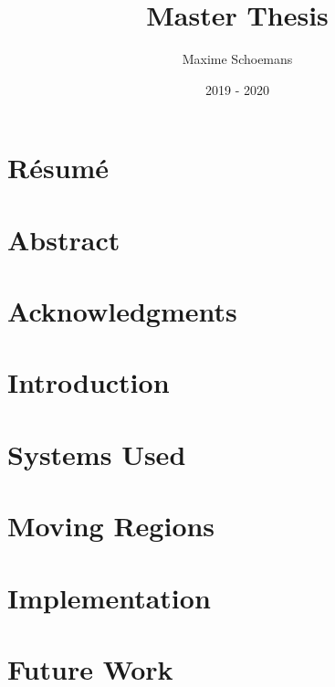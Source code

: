 \documentclass[12pt, twoside]{report}
\title{Master Thesis}
\author{Maxime Schoemans}
\date{2019 - 2020}
\begin{document}

\thispagestyle{empty}

\chapter*{Résumé}

\thispagestyle{empty}

\chapter*{Abstract}

\thispagestyle{empty}
 
\chapter*{Acknowledgments}

\thispagestyle{empty}

\clearpage
{}
\setcounter{page}{1}

\tableofcontents

\listoffigures

\listoftables

\clearpage
{}
\setcounter{page}{1}

\chapter{Introduction}


\chapter{Systems Used}
 

\chapter{Moving Regions}
 

\chapter{Implementation}





\chapter{Future Work}



 
\end{document}
